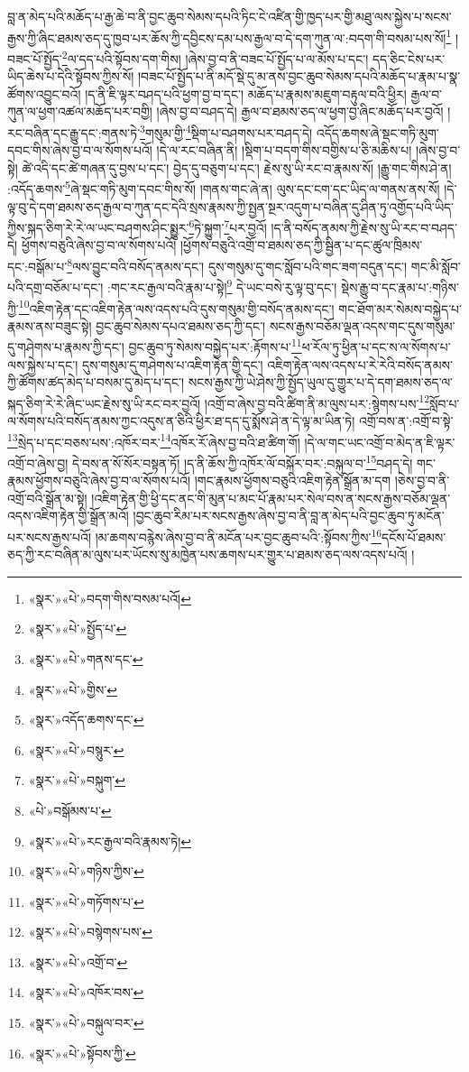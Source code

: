 བླ་ན་མེད་པའི་མཆོད་པ་རྒྱ་ཆེ་བ་ནི་བྱང་ཆུབ་སེམས་དཔའི་ཏིང་ངེ་འཛིན་གྱི་ཁྱད་པར་གྱི་མཐུ་ལས་སྐྱེས་པ་སངས་རྒྱས་ཀྱི་ཞིང་ཐམས་ཅད་དུ་ཁྱབ་པར་ཆོས་ཀྱི་དབྱིངས་དམ་པས་རྒྱལ་བ་དེ་དག་ཀུན་ལ་:བདག་གི་བསམ་པས་སོ།\footnote{«སྣར་»«པེ་»བདག་གིས་བསམ་པའོ།} །བཟང་པོ་སྤྱོད་\footnote{«སྣར་»«པེ་»སྤྱོད་པ་}ལ་དད་པའི་སྟོབས་དག་གིས། །ཞེས་བྱ་བ་ནི་བཟང་པོ་སྤྱོད་པ་ལ་མོས་པ་དང་། དད་ཅིང་ངེས་པར་ཡིད་ཆེས་པ་དེའི་སྟོབས་ཀྱིས་སོ། །བཟང་པོ་སྤྱོད་པ་ནི་མདོ་སྡེ་དུ་མ་ནས་བྱང་ཆུབ་སེམས་དཔའི་མཆོད་པ་རྣམ་པ་སྣ་ཚོགས་འབྱུང་བའོ། །ད་ནི་ཇི་ལྟར་བཤད་པའི་ཕྱག་བྱ་བ་དང་། མཆོད་པ་རྣམས་མཇུག་བརྟུལ་བའི་ཕྱིར། རྒྱལ་བ་ཀུན་ལ་ཕྱག་འཚལ་མཆོད་པར་བགྱི། །ཞེས་བྱ་བ་བཤད་དེ། རྒྱལ་བ་ཐམས་ཅད་ལ་ཕྱག་བྱ་ཞིང་མཆོད་པར་བྱའོ། །རང་བཞིན་དང་རྒྱུ་དང་:གནས་ཏེ་\footnote{«སྣར་»«པེ་»གནས་དང་}གསུམ་གྱི་\footnote{«སྣར་»«པེ་»གྱིས་}སྡིག་པ་བཤགས་པར་བཤད་དེ། འདོད་ཆགས་ཞེ་སྡང་གཏི་མུག་དབང་གིས་ཞེས་བྱ་བ་ལ་སོགས་པའོ། །དེ་ལ་རང་བཞིན་ནི། །སྡིག་པ་བདག་གིས་བགྱིས་པ་ཅི་མཆིས་པ། །ཞེས་བྱ་བ་སྟེ། ཚེ་འདི་དང་ཚེ་གཞན་དུ་བྱས་པ་དང་། བྱེད་དུ་བཅུག་པ་དང་། རྗེས་སུ་ཡི་རང་བ་རྣམས་སོ། །རྒྱུ་གང་གིས་ཤེ་ན། :འདོད་ཆགས་\footnote{«སྣར་»འདོད་ཆགས་དང་}ཞེ་སྡང་གཏི་མུག་དབང་གིས་སོ། །གནས་གང་ཞེ་ན། ལུས་དང་ངག་དང་ཡིད་ལ་གནས་ནས་སོ། །དེ་ལྟ་བུ་དེ་དག་ཐམས་ཅད་རྒྱལ་བ་ཀུན་དང་དེའི་སྲས་རྣམས་ཀྱི་སྤྱན་སྔར་འདུག་པ་བཞིན་དུ་ཤིན་ཏུ་འགྱོད་པའི་ཡིད་ཀྱིས་སྐད་ཅིག་རེ་རེ་ལ་ཡང་བཤགས་ཤིང་སྨྱུར་\footnote{«སྣར་»«པེ་»བསྙུར་}ཏེ་སྐྱུག་\footnote{«སྣར་»«པེ་»བསྐུག་}པར་བྱའོ། །ད་ནི་བསོད་ནམས་ཀྱི་རྗེས་སུ་ཡི་རང་བ་བཤད་དེ། ཕྱོགས་བཅུའི་ཞེས་བྱ་བ་ལ་སོགས་པའོ། །ཕྱོགས་བཅུའི་འགྲོ་བ་ཐམས་ཅད་ཀྱི་སྦྱིན་པ་དང་ཚུལ་ཁྲིམས་དང་:བསྒོམ་པ་\footnote{«པེ་»བསྒོམས་པ་}ལས་བྱུང་བའི་བསོད་ནམས་དང་། དུས་གསུམ་དུ་གང་སློབ་པའི་གང་ཟག་བདུན་དང་། གང་མི་སློབ་པའི་དགྲ་བཅོམ་པ་དང་། :གང་རང་རྒྱལ་བའི་རྣམ་པ་སྟེ།\footnote{«སྣར་»«པེ་»རང་རྒྱལ་བའི་རྣམས་ཏེ།} དེ་ཡང་བསེ་རུ་ལྟ་བུ་དང་། སྡེས་རྒྱུ་བ་དང་རྣམ་པ་:གཉིས་ཀྱི་\footnote{«སྣར་»«པེ་»གཉིས་ཀྱིས་}འཇིག་རྟེན་དང་འཇིག་རྟེན་ལས་འདས་པའི་དུས་གསུམ་གྱི་བསོད་ནམས་དང་། གང་ཐོག་མར་སེམས་བསྐྱེད་པ་རྣམས་ནས་བཟུང་སྟེ། བྱང་ཆུབ་སེམས་དཔའ་ཐམས་ཅད་ཀྱི་དང་། སངས་རྒྱས་བཅོམ་ལྡན་འདས་གང་དུས་གསུམ་དུ་གཤེགས་པ་རྣམས་ཀྱི་དང་། བྱང་ཆུབ་ཏུ་སེམས་བསྐྱེད་པར་:རྟོགས་པ་\footnote{«སྣར་»«པེ་»གཏོགས་པ་}ཕ་རོལ་ཏུ་ཕྱིན་པ་དང་ས་ལ་སོགས་པ་ལས་སྐྱེས་པ་དང་། དུས་གསུམ་དུ་གཤེགས་པ་འཇིག་རྟེན་གྱི་དང་། འཇིག་རྟེན་ལས་འདས་པ་རེ་རེའི་བསོད་ནམས་ཀྱི་ཚོགས་ཚད་མེད་པ་བསམ་དུ་མེད་པ་དང་། སངས་རྒྱས་ཀྱི་ཡེ་ཤེས་ཀྱི་སྤྱོད་ཡུལ་དུ་གྱུར་པ་དེ་དག་ཐམས་ཅད་ལ་སྐད་ཅིག་རེ་རེ་ཞིང་ཡང་རྗེས་སུ་ཡི་རང་བར་བྱའོ། །འགྲོ་བ་ཞེས་བྱ་བའི་ཚིག་ནི་མ་ལུས་པར་:སྙེགས་པས་\footnote{«སྣར་»«པེ་»བསྙེགས་པས་}སློབ་པ་ལ་སོགས་པའི་བསོད་ནམས་ཀྱང་འདུས་ན་ཅིའི་ཕྱིར་ཐ་དད་དུ་སྨོས་ཤེ་ན་དེ་ལྟ་མ་ཡིན་ཏེ། འགྲོ་བས་ན་:འགྲོ་བ་སྟེ་\footnote{«སྣར་»«པེ་»འགྲོ་བ་}སྲེད་པ་དང་བཅས་པས་:འཁོར་བར་\footnote{«སྣར་»«པེ་»འཁོར་བས་}འཁོར་རོ་ཞེས་བྱ་བའི་ཐ་ཚིག་གོ། །དེ་ལ་གང་ཡང་འགྲོ་བ་མེད་ན་ཇི་ལྟར་འགྲོ་བ་ཞེས་བྱ། དེ་བས་ན་སོ་སོར་བསྟན་ཏོ། །ད་ནི་ཆོས་ཀྱི་འཁོར་ལོ་བསྐོར་བར་:བསྐུལ་བ་\footnote{«སྣར་»«པེ་»བསྐུལ་བར་}བཤད་དེ། གང་རྣམས་ཕྱོགས་བཅུའི་ཞེས་བྱ་བ་ལ་སོགས་པའོ། །གང་རྣམས་ཕྱོགས་བཅུའི་འཇིག་རྟེན་སྒྲོན་མ་དག །ཅེས་བྱ་བ་ནི་འགྲོ་བའི་སྒྲོན་མ་སྟེ། །འཇིག་རྟེན་གྱི་ཕྱི་དང་ནང་གི་མུན་པ་མང་པོ་རྣམ་པར་སེལ་བས་ན་སངས་རྒྱས་བཅོམ་ལྡན་འདས་འཇིག་རྟེན་གྱི་སྒྲོན་མའོ། །བྱང་ཆུབ་རིམ་པར་སངས་རྒྱས་ཞེས་བྱ་བ་ནི་བླ་ན་མེད་པའི་བྱང་ཆུབ་ཏུ་མངོན་པར་སངས་རྒྱས་པའོ། །མ་ཆགས་བརྙེས་ཞེས་བྱ་བ་ནི་མངོན་པར་བྱང་ཆུབ་པའི་:སྟོབས་ཀྱིས་\footnote{«སྣར་»«པེ་»སྟོབས་ཀྱི་}དངོས་པོ་ཐམས་ཅད་ཀྱི་རང་བཞིན་མ་ལུས་པར་ཡོངས་སུ་མཁྱེན་པས་ཆགས་པར་གྱུར་པ་ཐམས་ཅད་ལས་འདས་པའོ། །
